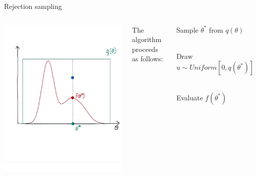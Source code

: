 \documentclass[compress]{beamer}
\begin{document}
\begin{frame}[label=sec-5-6]{Rejection sampling}
\begin{columns}[c] 
\includegraphics[width=1\linewidth]{RS5.png}

The algorithm proceeds as follows:\\
\begin{enumerate}
\item Sample $\theta^*$ from $q(\theta)$ \\~\\
\item Draw $u \sim Uniform[0, q(\theta^*)]$ \\~\\
\item Evaluate $f(\theta^*)$ \\~\\
\textcolor{white}{
\item[\color{white}] If $f(\theta^*) > u$ accept, else reject \\~\\
\item[\color{white}] Repeat steps 1-4
}
\end{enumerate}
\end{columns}
\end{frame}
\end{document}
